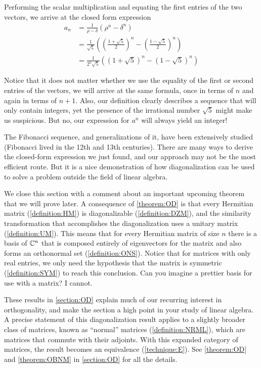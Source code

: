\documentclass{ximera}
\begin{document}
\begin{example}
Performing the scalar multiplication and equating the first entries of
the two vectors, we arrive at the closed form expression
\begin{align*}
a_n&=\frac{1}{\rho-\delta}\left(\rho^n-\delta^n\right)\\
&=\frac{1}{\sqrt{5}}
\left(\left(\frac{1+\sqrt{5}}{2}\right)^n-\left(\frac{1-\sqrt{5}}{2}\right)^n\right)\\
&=\frac{1}{2^n\sqrt{5}}
\left(\left(1+\sqrt{5}\right)^n-\left(1-\sqrt{5}\right)^n\right)
\end{align*}

Notice that it does not matter whether we use the equality of the
first or second entries of the vectors, we will arrive at the same
formula, once in terms of $n$ and again in terms of $n+1$.  Also, our
definition clearly describes a sequence that will only contain
integers, yet the presence of the irrational number $\sqrt{5}$ might
make us suspicious.  But no, our expression for $a^n$ will always
yield an integer!

The Fibonacci sequence, and generalizations of it, have been
extensively studied (Fibonacci lived in the 12th and 13th centuries).
There are many ways to derive the closed-form expression we just
found, and our approach may not be the most efficient route.  But it
is a nice demonstration of how diagonalization can be used to solve a
problem outside the field of linear algebra.

\end{example}

We close this section with a comment about an important upcoming
theorem that we will prove later.  A consequence of \ref{theorem:OD}
is that every Hermitian matrix (\ref{definition:HM}) is diagonalizable
(\ref{definition:DZM}), and the similarity transformation that
accomplishes the diagonalization uses a unitary matrix
(\ref{definition:UM}).  This means that for every Hermitian matrix of
size $n$ there is a basis of $\mathbb{C}^{n}$ that is composed entirely
of eigenvectors for the matrix and also forms an orthonormal set
(\ref{definition:ONS}).  Notice that for matrices with only real
entries, we only need the hypothesis that the matrix is symmetric
(\ref{definition:SYM}) to reach this conclusion.  Can you imagine a
prettier basis for use with a matrix?  I cannot.

These results in \ref{section:OD} explain much of our recurring
interest in orthogonality, and make the section a high point in your
study of linear algebra.  A precise statement of this diagonalization
result applies to a slightly broader class of matrices, known as
``normal'' matrices (\ref{definition:NRML}), which are matrices that
commute with their adjoints.  With this expanded category of matrices,
the result becomes an equivalence (\ref{technique:E}).  See
\ref{theorem:OD} and \ref{theorem:OBNM} in \ref{section:OD} for all
the details.
\end{document}
